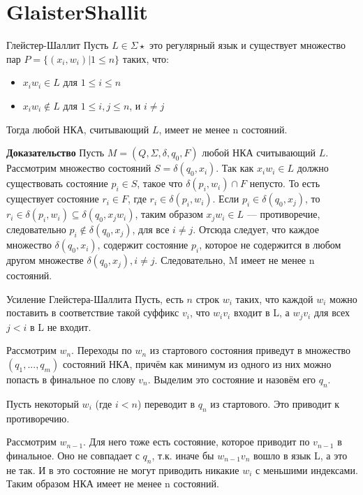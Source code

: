 \section{GlaisterShallit}
\begin{frame}{Глейстер-Шаллит}
    Пусть $L \in \Sigma \star$ это регулярный язык и существует множество пар $P = \{(x_i, w_i) | 1 \leqslant n\}$ таких, что:
    \begin{itemize}
        \item $x_i w_i \in L$ для $1 \leqslant i \leqslant n$
        \item $x_i w_i \notin L$ для $1 \leqslant i, j \leqslant n$, и $i \neq j$
    \end{itemize}
    Тогда любой НКА, считывающий $L$, имеет не менее n состояний.
    \begin{block}{\bf Доказательство}
        Пусть $M = (Q, \Sigma, \delta, q_0, F)$ любой НКА считывающий $L$. Рассмотрим множество состояний $S = \delta(q_0, x_i)$. Так как ${x_i}{w_i} \in L$ должно существовать состояние $p_i \in S$, такое что $\delta(p_i, w_i) \cap F$ непусто. То есть существует состояние $r_i \in F$, где $r_i \in \delta(p_i, w_i)$. Если $p_i \in \delta(q_0, x_j)$, то $r_i \in \delta(p_i, w_i) \subseteq \delta(q_0, {x_j}{w_i})$, таким образом ${x_j}{w_i} \in L$ — противоречие, следовательно $p_i \notin \delta(q_0, x_j)$, для все $i \neq j$. Отсюда следует, что каждое множество $\delta(q_0, x_i)$, содержит состояние $p_i$, которое не содержится в любом другом множестве $\delta(q_0, x_j), i \neq j$. Следовательно, M имеет не менее n состояний.
    \end{block}
\end{frame}
\begin{frame}{Усиление Глейстера-Шаллита}
    Пусть, есть $n$ строк $w_i$ таких, что каждой $w_i$ можно поставить в соответствие такой суффикс $v_i$, что $w_i v_i$ входит в L, а $w_j v_i$ для всех $j<i$ в L не входит.

    Рассмотрим $w_n$. Переходы по $w_n$ из стартового состояния приведут в множество $(q_1, ... ,q_m)$ состояний НКА, причём как минимум из одного из них можно попасть в финальное по слову $v_n$. Выделим это состояние и назовём его $q_n$.
    
    Пусть некоторый $w_i$ (где $i<n$) переводит в $q_n$ из стартового. Это приводит к противоречию.
    
    Рассмотрим $w_{n-1}$. Для него тоже есть состояние, которое приводит по $v_{n-1}$ в финальное. Оно не совпадает с $q_n$, т.к. иначе бы $w_{n-1} v_n$ вошло в язык L, а это не так. И в это состояние не могут приводить никакие $w_i$ с меньшими индексами. Таким образом НКА имеет не менее n состояний.
\end{frame}
